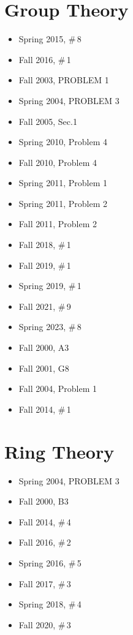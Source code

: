 \documentclass[11pt,letterpaper]{book}
\begin{document}
\section*{Group Theory}
\begin{itemize}
  \item Spring 2015, \#\,8
  \item Fall 2016, \#\,1
  \item Fall 2003, PROBLEM 1
  \item Spring 2004, PROBLEM 3
  \item Fall 2005, Sec.1
  \item Spring 2010, Problem 4
  \item Fall 2010, Problem 4
  \item Spring 2011, Problem 1
  \item Spring 2011, Problem 2
  \item Fall 2011, Problem 2
  \item Fall 2018, \#\,1
  \item Fall 2019, \#\,1
  \item Spring 2019, \#\,1
  \item Fall 2021, \#\,9
  \item Spring 2023, \#\,8
  \item Fall 2000, A3
  \item Fall 2001, G8
  \item Fall 2004, Problem 1
  \item Fall 2014, \#\,1
\end{itemize}

\section*{Ring Theory}
\begin{itemize}
  \item Spring 2004, PROBLEM 3
  \item Fall 2000, B3
  \item Fall 2014, \#\,4
  \item Fall 2016, \#\,2
  \item Spring 2016, \#\,5
  \item Fall 2017, \#\,3
  \item Spring 2018, \#\,4
  \item Fall 2020, \#\,3
\end{itemize}
\end{document}

